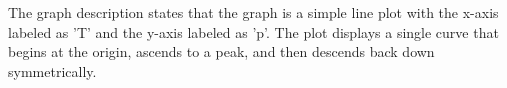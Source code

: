 The graph description states that the graph is a simple line plot with the x-axis labeled as 'T' and the y-axis labeled as 'p'. The plot displays a single curve that begins at the origin, ascends to a peak, and then descends back down symmetrically.